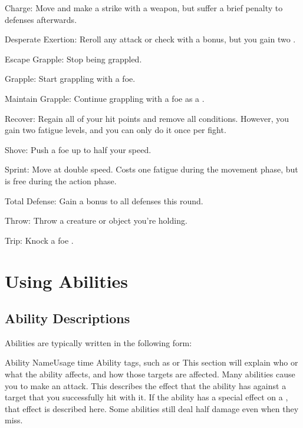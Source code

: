   \begin{raggeditemize}
    \item Charge: Move and make a strike with a weapon, but suffer a brief  penalty to defenses afterwards.
    \item Desperate Exertion: Reroll any attack or check with a  bonus, but you gain two .
    \item Escape Grapple: Stop being grappled.
    \item Grapple: Start grappling with a foe.
    \item Maintain Grapple: Continue grappling with a foe as a .
    \item Recover: Regain all of your hit points and remove all conditions. However, you gain two fatigue levels, and you can only do it once per fight.
    \item Shove: Push a foe up to half your speed.
    \item Sprint: Move at double speed. Costs one fatigue during the movement phase, but is free during the action phase.
    \item Total Defense: Gain a  bonus to all defenses this round.
    \item Throw: Throw a creature or object you're holding.
    \item Trip: Knock a foe \prone.
  \end{raggeditemize}

\section{Using Abilities}\label{Using Abilities}

  \subsection{Ability Descriptions}
    Abilities are typically written in the following form:
    \begin{activeability}{Ability Name}{Usage time}
      \abilitytags Ability tags, such as \atAttune or \atFire
      \rankline
      This section will explain who or what the ability affects, and how those targets are affected.
      Many abilities cause you to make an attack.
      \hit This describes the effect that the ability has against a target that you successfully hit with it.
      \crit If the ability has a special effect on a , that effect is described here.
      \miss Some abilities still deal half damage even when they miss.
    \end{activeability}

